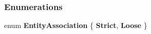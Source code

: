 \subsubsection*{Enumerations}
\begin{DoxyCompactItemize}
\item 
\hypertarget{namespace_m_b2_d_1_1_entity_component_af25b66eefb854495844f42e40c693767}{}\label{namespace_m_b2_d_1_1_entity_component_af25b66eefb854495844f42e40c693767} 
enum {\bfseries Entity\+Association} \{ {\bfseries Strict}, 
{\bfseries Loose}
 \}
\end{DoxyCompactItemize}
